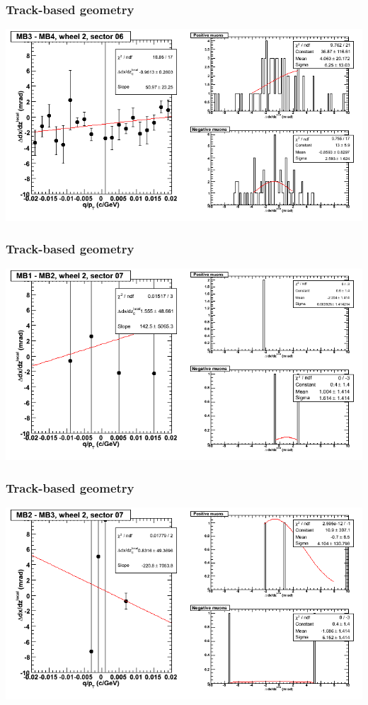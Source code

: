 \documentclass[compress]{beamer}
\begin{document}
\begin{frame}
\frametitle{Track-based geometry}
\includegraphics[width=\linewidth]{NOV4_segdiffs/dt13_slope_E_06_34.png}
\end{frame}

\begin{frame}
\frametitle{Track-based geometry}
\includegraphics[width=\linewidth]{NOV4_segdiffs/dt13_slope_E_07_12.png}
\end{frame}

\begin{frame}
\frametitle{Track-based geometry}
\includegraphics[width=\linewidth]{NOV4_segdiffs/dt13_slope_E_07_23.png}
\end{frame}
\end{document}
